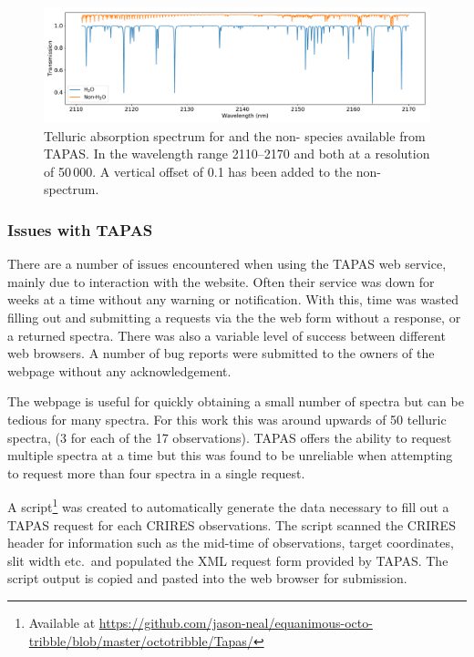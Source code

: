 \begin{figure}
    \centering
    \includegraphics[width=0.8\linewidth]{figures/atmos_and_models/telluric_components}
    \caption[Telluric spectra for the  and non- species.]{Telluric absorption spectrum for  and the non- species available from {TAPAS}.
        In the wavelength range 2110--2170\nm{} and both at a resolution of 50\,000.
        A vertical offset of 0.1 has been added to the non- spectrum.}
    \label{fig:telluriccomponents}
\end{figure}


\subsubsection{Issues with {TAPAS}}
There are a number of issues encountered when using the {TAPAS} web service, mainly due to interaction with the website.
Often their service was down for weeks at a time without any warning or notification.
With this, time was wasted filling out and submitting a requests via the the web form without a response, or a returned spectra.
There was also a variable level of success between different web browsers.
A number of bug reports were submitted to the owners of the webpage without any acknowledgement.

The webpage is useful for quickly obtaining a small number of spectra but can be tedious for many spectra.
For this work this was around upwards of 50 telluric spectra, (3 for each of the 17 observations).
{TAPAS} offers the ability to request multiple spectra at a time but this was found to be unreliable when attempting to request more than four spectra in a single request.

A script\footnote{Available at \href{https://github.com/jason-neal/equanimous-octo-tribble/blob/master/octotribble/Tapas/}{https://github.com/jason-neal/equanimous-octo-tribble/blob/master/octotribble/Tapas/}} was created to automatically generate the data necessary to fill out a {TAPAS} request for each {CRIRES} observations.
The script scanned the {CRIRES} header for information such as the mid-time of observations, target coordinates, slit width etc.\ and populated the {XML} request form provided by {TAPAS}.
The script output is copied and pasted into the web browser for submission.

